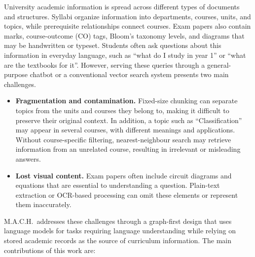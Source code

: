 \documentclass[conference]{IEEEtran}
\begin{document}
University academic information is spread across different types of documents and structures. Syllabi organize information into departments, courses, units, and topics, while prerequisite relationships connect courses. Exam papers also contain marks, course-outcome (CO) tags, Bloom's taxonomy levels, and diagrams that may be handwritten or typeset. Students often ask questions about this information in everyday language, such as ``what do I study in year 1'' or ``what are the textbooks for it''. However, serving these queries through a general-purpose chatbot or a conventional vector search system presents two main challenges.

\begin{itemize}
\item \textbf{Fragmentation and contamination.} Fixed-size chunking can separate topics from the units and courses they belong to, making it difficult to preserve their original context. In addition, a topic such as ``Classification'' may appear in several courses, with different meanings and applications. Without course-specific filtering, nearest-neighbour search may retrieve information from an unrelated course, resulting in irrelevant or misleading answers.

\item \textbf{Lost visual content.} Exam papers often include circuit diagrams and equations that are essential to understanding a question. Plain-text extraction or OCR-based processing can omit these elements or represent them inaccurately.
\end{itemize}

M.A.C.H.\ addresses these challenges through a graph-first design that uses language models for tasks requiring language understanding while relying on stored academic records as the source of curriculum information. The main contributions of this work are:
\end{document}
